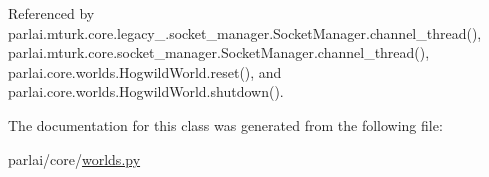 Referenced by parlai.\+mturk.\+core.\+legacy\+\_.\+socket\+\_\+manager.\+Socket\+Manager.\+channel\+\_\+thread(), parlai.\+mturk.\+core.\+socket\+\_\+manager.\+Socket\+Manager.\+channel\+\_\+thread(), parlai.\+core.\+worlds.\+Hogwild\+World.\+reset(), and parlai.\+core.\+worlds.\+Hogwild\+World.\+shutdown().



The documentation for this class was generated from the following file\+:\begin{DoxyCompactItemize}
\item 
parlai/core/\hyperlink{parlai_2core_2worlds_8py}{worlds.\+py}\end{DoxyCompactItemize}
